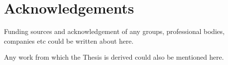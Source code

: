 \clearpage
\chapter*{Acknowledgements}

Funding sources and acknowledgement of any groups, professional bodies, companies etc could be written about here.

Any work from which the Thesis is derived could also be mentioned here.
